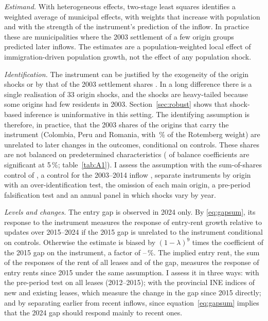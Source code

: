 \documentclass[11pt,a4paper]{article}
\begin{document}
\textit{Estimand.} With heterogeneous effects, two-stage least squares identifies a weighted average of municipal effects, with weights that increase with population and with the strength of the instrument's prediction of the inflow. In practice these are municipalities where the 2003 settlement of a few origin groups predicted later inflows. The estimates are a population-weighted local effect of immigration-driven population growth, not the effect of any population shock.

\textit{Identification.} The instrument can be justified by the exogeneity of the origin shocks \citep{borusyak2022} or by that of the 2003 settlement shares \citep{goldsmith2020}. In a long difference there is a single realisation of 33 origin shocks, and the shocks are heavy-tailed because some origins had few residents in 2003. Section~\ref{sec:robust} shows that shock-based inference \citep{adao2019,borusyak2023} is uninformative in this setting. The identifying assumption is therefore, in practice, that the 2003 shares of the origins that carry the instrument (Colombia, Peru and Romania, with \rotTop\,\% of the Rotemberg weight) are unrelated to later changes in the outcomes, conditional on controls. These shares are not balanced on predetermined characteristics (\balNsig{} of \balN{} balance coefficients are significant at 5\,\%; table~\ref{tab:A1}). I assess the assumption with the sum-of-shares control of \citet{borusyak2022}, a control for the 2003--2014 inflow \citep{jaeger2018}, separate instruments by origin with an over-identification test, the omission of each main origin, a pre-period falsification test and an annual panel in which shocks vary by year.

\textit{Levels and changes.} The entry gap is observed in 2024 only. By \eqref{eq:gapsum}, its response to the instrument measures the response of entry-rent growth relative to updates over 2015--2024 if the 2015 gap is unrelated to the instrument conditional on controls. Otherwise the estimate is biased by $(1-\lambda)^9$ times the coefficient of the 2015 gap on the instrument, a factor of \mcWgLo--\mcWgHi\,\%. The implied entry rent, the sum of the responses of the rent of all leases and of the gap, measures the response of entry rents since 2015 under the same assumption. I assess it in three ways: with the pre-period test on all leases (2012--2015); with the provincial INE indices of new and existing leases, which measure the change in the gap since 2015 directly; and by separating earlier from recent inflows, since equation~\eqref{eq:gapsum} implies that the 2024 gap should respond mainly to recent ones.
\end{document}
